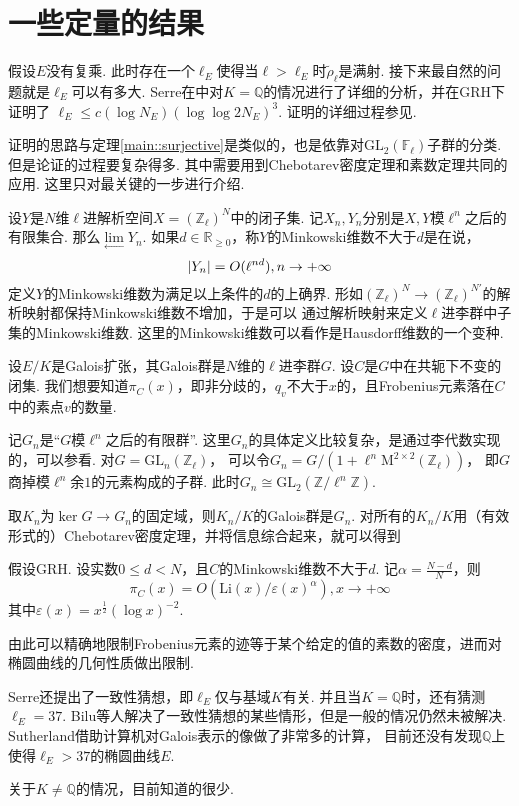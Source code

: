 \chapter{一些定量的结果}

假设$E$没有复乘. 此时存在一个$\ell_E$使得当$\ell>\ell_E$时$\tilde{\rho}_{\ell}$是满射.
接下来最自然的问题就是$\ell_{E}$可以有多大.
Serre在\parencite{serre1981quelques}中对$K=\mathbb{Q}$的情况进行了详细的分析，并在GRH下证明了
$\ell_E \leq c(\log N_E) (\log\log 2N_E)^3$. 证明的详细过程参见\parencite[][p. 196]{serre1981quelques}.

证明的思路与定理\ref{main::surjective}是类似的，也是依靠对$\mathrm{GL}_2(\mathbb{F}_{\ell})$子群的分类.
但是论证的过程要复杂得多.
其中需要用到Chebotarev密度定理和素数定理共同的应用.
这里只对最关键的一步进行介绍.

设$Y$是$N$维$\ell$进解析空间$X = (\mathbb{Z}_{\ell})^N$中的闭子集.
记$X_n,Y_n$分别是$X,Y$模$\ell^n$之后的有限集合.
那么$\lim\limits_{\longleftarrow} Y_n$.
如果$d\in \mathbb{R}_{\geq 0}$，称$Y$的Minkowski维数不大于$d$是在说，
\begin{equation}
    \left|Y_n\right| = O(\ell^{nd}),n\to +\infty
\end{equation}
定义$Y$的Minkowski维数为满足以上条件的$d$的上确界.
形如$(\mathbb{Z}_{\ell})^{N}\to (\mathbb{Z}_{\ell})^{N'}$的解析映射都保持Minkowski维数不增加，于是可以
通过解析映射来定义$\ell$进李群中子集的Minkowski维数.
这里的Minkowski维数可以看作是Hausdorff维数的一个变种.

设$E/K$是Galois扩张，其Galois群是$N$维的$\ell$进李群$G$. 设$C$是$G$中在共轭下不变的闭集.
我们想要知道$\pi_C(x)$，即非分歧的，$q_v$不大于$x$的，且Frobenius元素落在$C$中的素点$v$的数量.

记$G_n$是“$G$模$\ell^n$之后的有限群”.
这里$G_n$的具体定义比较复杂，是通过李代数实现的，可以参看\parencite[][p. 151]{serre1981quelques}.
对$G=\mathrm{GL}_n(\mathbb{Z}_{\ell})$，
可以令$G_n = G/( 1 + \ell^n \mathrm{M}^{2\times 2}(\mathbb{Z}_{\ell}))$，
即$G$商掉模$\ell^n$余$1$的元素构成的子群. 此时$G_n\cong \mathrm{GL}_2(\mathbb{Z}/\ell^n \mathbb{Z})$.

取$K_n$为$\ker G\to G_n$的固定域，则$K_n/K$的Galois群是$G_n$.
对所有的$K_n/K$用（有效形式的）Chebotarev密度定理，并将信息综合起来，就可以得到
\begin{cthm}
    假设GRH.
    设实数$0\leq d<N$，且$C$的Minkowski维数不大于$d$.
    记$\alpha=\frac{N-d}{N}$，则
    \begin{equation}
        \pi_C(x) = O(\mathrm{Li}(x)/\varepsilon(x)^{\alpha}), x\to +\infty
    \end{equation}
    其中$\varepsilon(x) = x^{\frac{1}{2}} (\log x)^{-2}$.
\end{cthm}

由此可以精确地限制Frobenius元素的迹等于某个给定的值的素数的密度，进而对椭圆曲线的几何性质做出限制.

Serre还提出了一致性猜想，即$\ell_{E}$仅与基域$K$有关. 并且当$K = \mathbb{Q}$时，还有猜测$\ell_{E} = 37$.
Bilu等人解决了一致性猜想的某些情形\parencite{bilu2011serre}，但是一般的情况仍然未被解决.
Sutherland\parencite{sutherland}借助计算机对Galois表示的像做了非常多的计算，
目前还没有发现$\mathbb{Q}$上使得$\ell_{E}>37$的椭圆曲线$E$.

关于$K\neq \mathbb{Q}$的情况，目前知道的很少.
